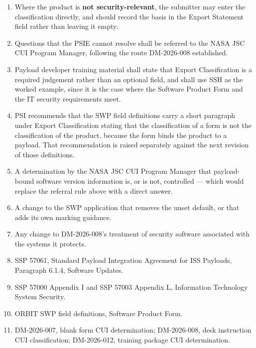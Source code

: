 {\begin{enumerate}
\item Where the product is \textbf{not security-relevant}, the submitter may
enter the classification directly, and should record the basis in the Export
Statement field rather than leaving it empty.

\item Questions that the PSIE cannot resolve shall be referred to the NASA JSC
CUI Program Manager, following the route DM-2026-008 established.


\item Payload developer training material shall state that Export
Classification is a required judgement rather than an optional field, and shall
use SSH as the worked example, since it is the case where the Software Product
Form and the IT security requirements meet.

\item PSI recommends that the SWP field definitions carry a short paragraph
under Export Classification stating that the classification of a form is not
the classification of the product, because the form binds the product to a
payload. That recommendation is raised separately against the next revision of
those definitions.


\item A determination by the NASA JSC CUI Program Manager that payload-bound
software version information is, or is not, controlled --- which would replace
the referral rule above with a direct answer.

\item A change to the SWP application that removes the unset default, or that
adds its own marking guidance.

\item Any change to DM-2026-008's treatment of security software associated
with the systems it protects.


\item SSP 57061, Standard Payload Integration Agreement for ISS Payloads,
Paragraph 6.1.4, Software Updates.

\item SSP 57000 Appendix I and SSP 57003 Appendix L, Information Technology
System Security.

\item ORBIT SWP field definitions, Software Product Form.

\item DM-2026-007, blank form CUI determination; DM-2026-008, desk instruction
CUI classification; DM-2026-012, training package CUI determination.

\end{enumerate}
}


